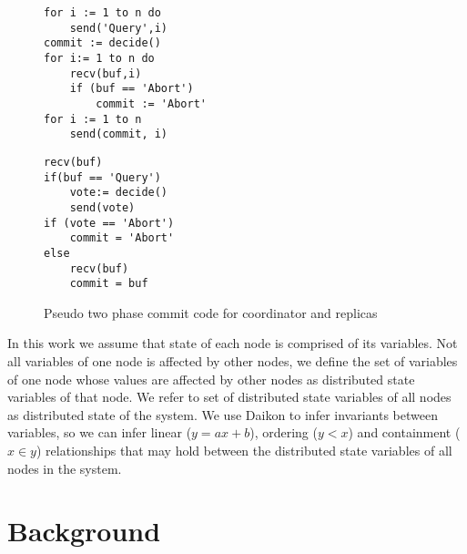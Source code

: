 \begin{figure}
\centering
\begin{lstlisting}[caption={Coordinator Code}]
for i := 1 to n do
	send('Query',i)
commit := decide()
for i:= 1 to n do
	recv(buf,i)
	if (buf == 'Abort')
		commit := 'Abort'
for i := 1 to n
	send(commit, i)
\end{lstlisting}
\begin{lstlisting}[caption={Replica Code}]
recv(buf)
if(buf == 'Query')
	vote:= decide()
	send(vote)
if (vote == 'Abort')
	commit = 'Abort'
else
	recv(buf)
	commit = buf
\end{lstlisting}
\caption{Pseudo two phase commit code for coordinator and replicas}
\label{lst:2pc}
\end{figure}

In this work we 
assume that state of each node is comprised of its variables. Not all variables of one node is affected by other nodes, we define the set of variables of one node whose values are affected by other nodes as distributed state variables of that node. We refer to set of distributed 
state variables of all nodes as distributed state of the system. We use Daikon \cite{ernst2001dynamically} to infer invariants between variables, so we can infer linear ($y = ax + b$), ordering ($y < x$) and containment ($x \in y$) relationships that may hold between the distributed state variables of all nodes in the system.



\section{Background}

